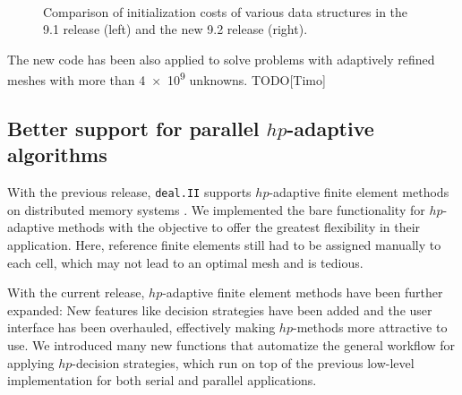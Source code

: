 \documentclass{ansarticle-preprint}
\newcommand{\specialword}[1]{\texttt{#1}}
\newcommand{\dealii}{{\specialword{deal.II}}\xspace}
\begin{document}
\begin{figure}
  \\
  \strut\hfill{}\hfill\strut
  \caption{Comparison of initialization costs of various data structures in the 9.1 release (left) and the new 9.2 release (right).}
  \label{fig:init_costs}
\end{figure}


The new code has been also applied to solve problems with adaptively refined
meshes with more than \num{4e9} unknowns. {\color{red}TODO[Timo]}



\subsection{Better support for parallel $hp$-adaptive algorithms}
\label{subsec:hp}

With the previous release, \dealii supports $hp$-adaptive finite element methods
on distributed memory systems \cite{dealII91}. We implemented the bare functionality
for $hp$-adaptive methods with the objective to offer the greatest flexibility in
their application. Here, reference finite elements still had to be assigned manually
to each cell, which may not lead to an optimal mesh and is tedious.

With the current release, $hp$-adaptive finite element methods have been further
expanded: New features like decision strategies have been added and the user interface
has been overhauled, effectively making $hp$-methods more attractive to use. We introduced
many new functions that automatize the general workflow for applying $hp$-decision
strategies, which run on top of the previous low-level implementation for both serial
and parallel applications.
\end{document}
